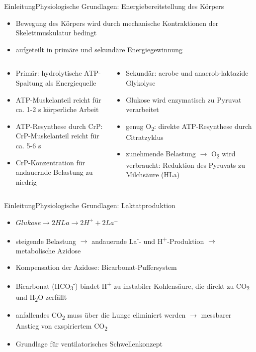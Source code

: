 \documentclass[
handout, 
aspectratio=141, 
10pt,
xcolor=dvipsnames]
{beamer}
\begin{document}
\begin{frame}{Einleitung}{Physiologische Grundlagen: Energiebereitstellung des Körpers}
\begin{itemize}
	\item Bewegung des Körpers wird durch mechanische Kontraktionen der Skelettmuskulatur bedingt
	\item aufgeteilt in primäre und sekundäre Energiegewinnung
\end{itemize}
\begin{columns}
	\begin{column}{0.5\linewidth}
		\begin{itemize}
			\item Primär: hydrolytische ATP-Spaltung als Energiequelle
			\item ATP-Muskelanteil reicht für ca. 1-2 \si{\second} körperliche Arbeit
			\item ATP-Resynthese durch CrP: CrP-Muskelanteil reicht für ca. 5-6 \si{\second}
			\item CrP-Konzentration für andauernde Belastung zu niedrig
		\end{itemize}
	\end{column}
	\begin{column}{0.5\linewidth}
		\begin{itemize}
			\item Sekundär: aerobe und anaerob-laktazide Glykolyse
			\item Glukose wird enzymatisch zu Pyruvat verarbeitet
			\item genug O\textsubscript{2}: direkte ATP-Resynthese durch Citratzyklus
			\item zunehmende Belastung $\rightarrow$ O\textsubscript{2} wird verbraucht: Reduktion des Pyruvats zu Milchsäure (HLa)
		\end{itemize}
	\end{column}
\end{columns}
\end{frame}

\begin{frame}{Einleitung}{Physiologische Grundlagen: Laktatproduktion}
\begin{itemize}
	\item $Glukose \rightarrow 2HLa \rightarrow 2H^+ + 2La^-$
	\item steigende Belastung $\rightarrow$ andauernde La\textsuperscript{-}- und H\textsuperscript{+}-Produktion $\rightarrow$ metabolische Azidose
	\item Kompensation der Azidose: Bicarbonat-Puffersystem
	\item Bicarbonat (HCO\textsubscript{3}\textsuperscript{-}) bindet H\textsuperscript{+} zu instabiler Kohlensäure, die direkt zu CO\textsubscript{2} und H\textsubscript{2}O zerfällt
	\item anfallendes CO\textsubscript{2} muss über die Lunge eliminiert werden $\rightarrow$ messbarer Anstieg von exspiriertem CO\textsubscript{2}
	\item Grundlage für ventilatorisches Schwellenkonzept
\end{itemize}
\end{frame}
\end{document}
